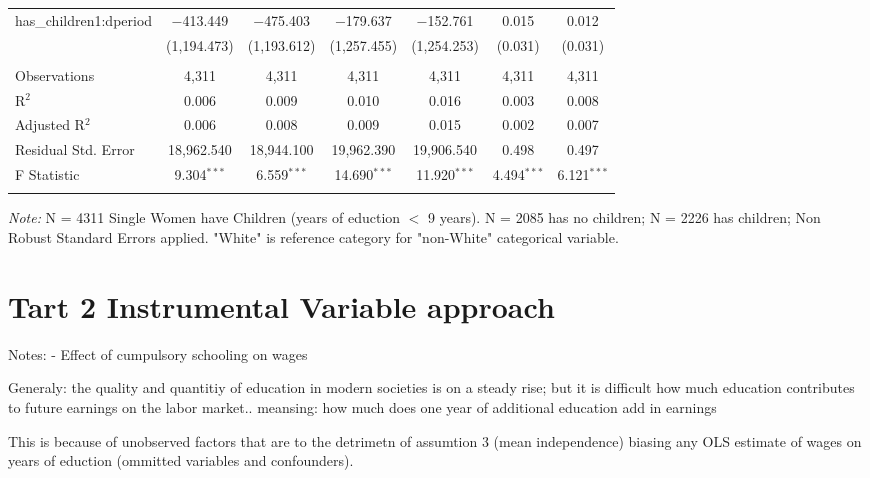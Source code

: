 \documentclass[a4paper]{article}
\begin{document}
\begin{table}[!htbp]
\begin{adjustwidth}{0.cm}{-0cm}
\begin{threeparttable}
\begin{tabular}{@{\extracolsep{-2pt}}lcccccc}
  has\_children1:dperiod & $-$413.449 & $-$475.403 & $-$179.637 & $-$152.761 & 0.015 & 0.012 \\ 
  & (1,194.473) & (1,193.612) & (1,257.455) & (1,254.253) & (0.031) & (0.031) \\ 
 \hline \\[-1.8ex] 
Observations & 4,311 & 4,311 & 4,311 & 4,311 & 4,311 & 4,311 \\ 
R$^{2}$ & 0.006 & 0.009 & 0.010 & 0.016 & 0.003 & 0.008 \\ 
Adjusted R$^{2}$ & 0.006 & 0.008 & 0.009 & 0.015 & 0.002 & 0.007 \\ 
Residual Std. Error & 18,962.540  & 18,944.100 & 19,962.390  & 19,906.540 & 0.498 & 0.497 \\ 
F Statistic & 9.304$^{***}$ & 6.559$^{***}$ & 14.690$^{***}$  & 11.920$^{***}$  & 4.494$^{***}$  & 6.121$^{***}$ \\
\hline 
\hline \\[-3.5ex] 
\end{tabular} 
\begin{tablenotes}
      \small
      \item\textit{Note:} N = 4311 Single Women have Children (years of eduction $<$ 9 years). N = 2085 has no children; N = 2226 has children; Non Robust Standard Errors applied. "White" is reference category for "non-White" categorical variable.
    \end{tablenotes}
\end{threeparttable}
\end{adjustwidth}
%
\end{table}




\pagebreak

\section{Tart 2 Instrumental Variable approach}


Notes:
- Effect of cumpulsory schooling on wages

Generaly: the quality and quantitiy of education in modern societies is on a steady rise; but it is difficult how much education contributes to future earnings on the labor market.. meansing: how much does one year of additional education add in earnings

This is because of unobserved factors that are to the detrimetn of assumtion 3 (mean independence) biasing any OLS estimate of wages on years of eduction (ommitted variables and confounders).
\end{document}
